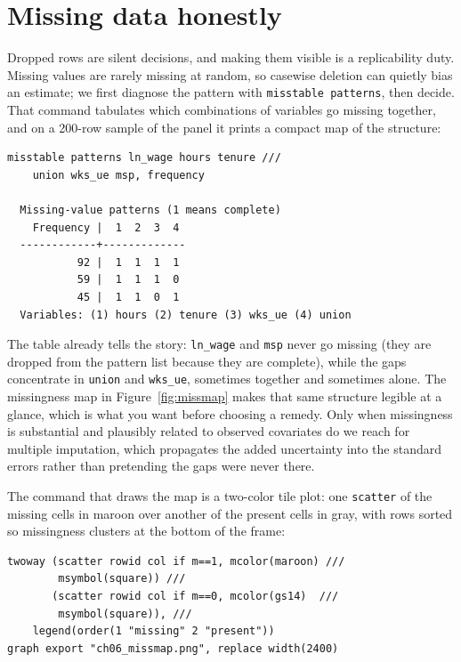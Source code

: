 \documentclass[
    a4paper,
    fontsize=10pt,
    twoside=true,
    numbers=noenddot,
]{kaobook}
\begin{document}
\section{Missing data honestly}
Dropped rows are silent decisions, and making them visible is a replicability duty. Missing values are rarely missing at random, so casewise deletion can quietly bias an estimate; we first diagnose the pattern with \texttt{misstable patterns}, then decide. That command tabulates which combinations of variables go missing together, and on a 200-row sample of the panel it prints a compact map of the structure:
{\footnotesize
\begin{verbatim}
misstable patterns ln_wage hours tenure ///
    union wks_ue msp, frequency

  Missing-value patterns (1 means complete)
    Frequency |  1  2  3  4
  ------------+-------------
           92 |  1  1  1  1
           59 |  1  1  1  0
           45 |  1  1  0  1
  Variables: (1) hours (2) tenure (3) wks_ue (4) union
\end{verbatim}
}
The table already tells the story: \texttt{ln\_wage} and \texttt{msp} never go missing (they are dropped from the pattern list because they are complete), while the gaps concentrate in \texttt{union} and \texttt{wks\_ue}, sometimes together and sometimes alone. The missingness map in Figure~\ref{fig:missmap} makes that same structure legible at a glance, which is what you want before choosing a remedy. Only when missingness is substantial and plausibly related to observed covariates do we reach for multiple imputation, which propagates the added uncertainty into the standard errors rather than pretending the gaps were never there.

The command that draws the map is a two-color tile plot: one \texttt{scatter} of the missing cells in maroon over another of the present cells in gray, with rows sorted so missingness clusters at the bottom of the frame:
{\footnotesize
\begin{verbatim}
twoway (scatter rowid col if m==1, mcolor(maroon) ///
        msymbol(square)) ///
       (scatter rowid col if m==0, mcolor(gs14)  ///
        msymbol(square)), ///
    legend(order(1 "missing" 2 "present"))
graph export "ch06_missmap.png", replace width(2400)
\end{verbatim}
}
\end{document}
